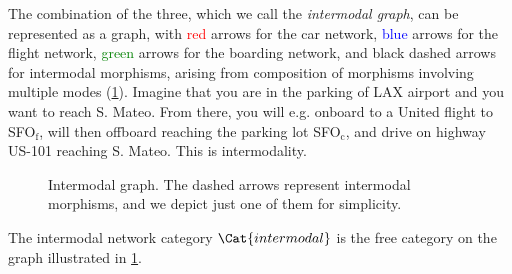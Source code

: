 \begin{example}
The combination of the three, which we call the \emph{intermodal graph}, can be represented as a graph, with \textcolor{red}{red} arrows for the car network, \textcolor{blue}{blue} arrows for the flight network, \textcolor{green}{green} arrows for the boarding network, and black dashed arrows for intermodal morphisms, arising from composition of morphisms involving multiple modes (\cref{fig:intermodal}). Imagine that you are in the parking of \textsf{LAX} airport and you want to reach \textsf{S. Mateo}. From there, you will e.g. onboard to a \textsf{United} flight to \textsf{SFO}$_\mathrm{f}$, will then offboard reaching the parking lot \textsf{SFO}$_\mathrm{c}$, and drive on highway \textsf{US-101} reaching \textsf{S. Mateo}. This is intermodality.

\begin{figure}[h!]
\begin{center}
\end{center}
\caption{Intermodal graph. The dashed arrows represent intermodal morphisms, and we depict just one of them for simplicity. \label{fig:intermodal}}
\end{figure}
\end{example}

The intermodal network category $\Cat{intermodal}$ is the free category on the graph illustrated in \cref{fig:intermodal}.

